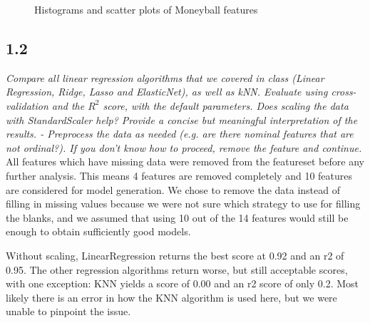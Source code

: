 \begin{figure}

\caption{Histograms and scatter plots of Moneyball features}
\label{fig:scatter_hist} %

\end{figure}

\subsection{1.2}
{\it Compare all linear regression algorithms that we covered in class (Linear Regression, Ridge, Lasso and ElasticNet), as well as kNN. Evaluate using cross-validation and the $R^2$ score, with the default parameters. Does scaling the data with StandardScaler help? Provide a concise but meaningful interpretation of the results.
- Preprocess the data as needed (e.g. are there nominal features that are not ordinal?). If you don't know how to proceed, remove the feature and continue.}\\

All features which have missing data were removed from the featureset before any further analysis. This means 4 features are removed completely and 10 features are considered for model generation. We chose to remove the data instead of filling in missing values because we were not sure which strategy to use for filling the blanks, and we assumed that using 10 out of the 14 features would still be enough to obtain sufficiently good models.

Without scaling, LinearRegression returns the best score at 0.92 and an r2 of 0.95. The other regression algorithms return worse, but still acceptable scores, with one exception: KNN yields a score of 0.00 and an r2 score of only 0.2. Most likely there is an error in how the KNN algorithm is used here, but we were unable to pinpoint the issue.

